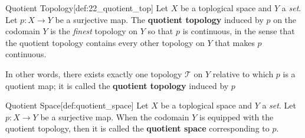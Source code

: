 \begin{defBox}{Quotient Topology}[def:22_quotient_top]
    Let \( X \) be a toplogical space and \( Y \) a \textit{set}.
    Let \( p: X \rightarrow Y \) be a surjective map.
    The \textbf{quotient topology} induced by \( p \) on the codomain
    \( Y \) is the \textit{finest} topology on \( Y \) so that \( p \) is 
    continuous, in the sense that the quotient topology contains every other topology on \( Y \) that makes \( p \) continuous.

    \baseSkip 

    In other words, there exists exactly one topology 
    \( \mathcal{T} \) on \( Y \) relative to which \( p \) is a quotient 
    map; it is called the \textbf{quotient topology} induced by \( p \)
\end{defBox}

\begin{defBox}{Quotient Space}[def:quotient_space]
    Let \( X \) be a toplogical space and \( Y \) a \textit{set}.
    Let \( p: X \rightarrow Y \) be a surjective map.
    When the codomain \( Y \) is equipped with the quotient topology, then it
    is called the \textbf{quotient space} corresponding to \( p \).
\end{defBox}